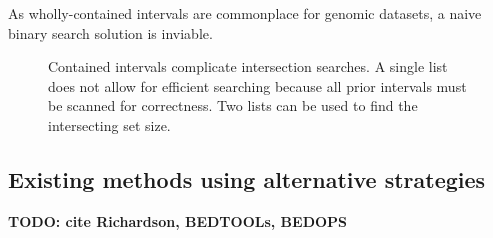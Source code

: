 \documentclass{bioinfo}
\begin{document}
	As wholly-contained intervals are commonplace for genomic datasets,
	a naive binary search solution is inviable.
	
	\begin{figure}[h]
		\centering
		\caption{Contained intervals complicate intersection searches.
		A single list  does not allow for
		efficient searching because all prior intervals must be scanned for
		correctness. Two lists  can be used to
		find the intersecting set size.}
		\label{bitssearching}
	\end{figure}
	

	\subsection{Existing methods using alternative strategies}

	\textbf{TODO: cite Richardson, BEDTOOLs, BEDOPS}
\end{document}
